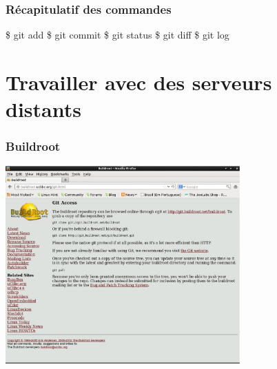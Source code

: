 \documentclass{beamer}
\begin{document}
\begin{frame}[fragile]\frametitle{Récapitulatif des commandes}

  \begin{semiverbatim}
    \$ git add
    \$ git commit
    \$ git status
    \$ git diff
    \$ git log
  \end{semiverbatim}


\end{frame}


    \section{Travailler avec des serveurs distants}
    \begin{frame}
      \frametitle{Buildroot}
        \includegraphics[width=9cm]{imgs/buildroot.eps}
    \end{frame}
\end{document}
